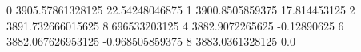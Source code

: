 0 3905.57861328125 22.54248046875
1 3900.8505859375 17.814453125
2 3891.732666015625 8.696533203125
4 3882.9072265625 -0.12890625
6 3882.067626953125 -0.968505859375
8 3883.0361328125 0.0
